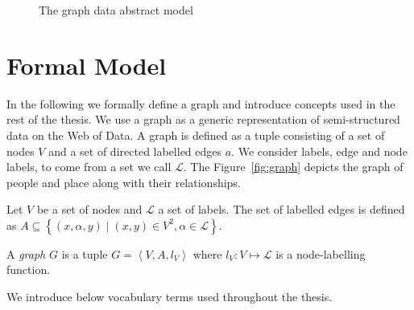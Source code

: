 \begin{figure}
	\centering
	\resizebox{.8\textwidth}{!}{
		
	}
	\caption{The graph data abstract model}
	\label{fig:gdm}
\end{figure}

\section{Formal Model}
\label{sec:gdm:formal-model}

In the following we formally define a graph and introduce concepts used in the rest of the thesis. We use a graph as a generic representation of semi-structured data on the Web of Data. A graph is defined as a tuple consisting of a set of nodes $V$ and a set of directed labelled edges $a$. We consider labels, edge and node labels, to come from a set we call $\mathcal{L}$. The Figure~\ref{fig:graph} depicts the graph of people and place along with their relationships.

\begin{definition}[Graph]
	Let $V$ be a set of nodes and $\mathcal{L}$ a set of labels. The set of labelled edges is defined as $A \subseteq \left\lbrace (x, \alpha, y) \mid (x, y) \in V^2, \alpha \in \mathcal{L} \right\rbrace$.

	A \emph{graph} $G$ is a tuple $G = \left\langle V, A, l_V \right\rangle$ where $l_V : V \mapsto \mathcal{L}$ is a node-labelling function.
\end{definition}

We introduce below vocabulary terms used throughout the thesis.

